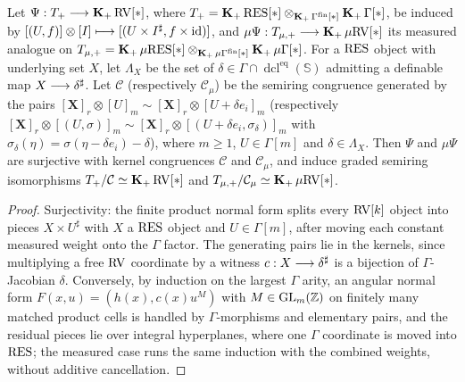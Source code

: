 \setcounter{theorem}{17}
\begin{proposition}
\label{red-D-iso}
\leanok
{}
Let $\Psi : T_+ \longrightarrow \operatorname{\mathbf{K}_+} \mathrm{RV}[*]$, where $T_+ = \operatorname{\mathbf{K}_+} \mathrm{RES}[*] \otimes_{\operatorname{\mathbf{K}_+} \Gamma^{\mathrm{fin}}[*]} \operatorname{\mathbf{K}_+} \Gamma[*]$, be induced by $[(U, f)] \otimes [I] \longmapsto [(U \times I^\sharp, f \times \operatorname{id})]$, and $\mu\Psi : T_{\mu,+} \longrightarrow \operatorname{\mathbf{K}_+} \mu\mathrm{RV}[*]$ its measured analogue on $T_{\mu,+} = \operatorname{\mathbf{K}_+} \mu\mathrm{RES}[*] \otimes_{\operatorname{\mathbf{K}_+} \mu\Gamma^{\mathrm{fin}}[*]} \operatorname{\mathbf{K}_+} \mu\Gamma[*]$. For a $\mathrm{RES}$ object with underlying set $X$, let $\Lambda_X$ be the set of $\delta \in \Gamma \cap \operatorname{dcl}^{\mathrm{eq}}(\mathbb{S})$ admitting a definable map $X \longrightarrow \delta^\sharp$. Let $\mathcal{C}$ (respectively $\mathcal{C}_\mu$) be the semiring congruence generated by the pairs $[\boldsymbol{X}]_r \otimes [U]_m \sim [\boldsymbol{X}]_r \otimes [U + \delta e_i]_m$ (respectively $[\boldsymbol{X}]_r \otimes [(U, \sigma)]_m \sim [\boldsymbol{X}]_r \otimes [(U + \delta e_i, \sigma_\delta)]_m$ with $\sigma_\delta(\eta) = \sigma(\eta - \delta e_i) - \delta$), where $m \geq 1$, $U \in \Gamma[m]$ and $\delta \in \Lambda_X$. Then $\Psi$ and $\mu\Psi$ are surjective with kernel congruences $\mathcal{C}$ and $\mathcal{C}_\mu$, and induce graded semiring isomorphisms $T_+/\mathcal{C} \simeq \operatorname{\mathbf{K}_+} \mathrm{RV}[*]$ and $T_{\mu,+}/\mathcal{C}_\mu \simeq \operatorname{\mathbf{K}_+} \mu\mathrm{RV}[*]$.
\end{proposition}

\begin{proof}
\leanok
Surjectivity: the finite product normal form splits every $\mathrm{RV}[k]$ object into pieces $X \times U^\sharp$ with $X$ a $\mathrm{RES}$ object and $U \in \Gamma[m]$, after moving each constant measured weight onto the $\Gamma$ factor. The generating pairs lie in the kernels, since multiplying a free $\mathrm{RV}$ coordinate by a witness $c : X \longrightarrow \delta^\sharp$ is a bijection of $\Gamma$-Jacobian $\delta$. Conversely, by induction on the largest $\Gamma$ arity, an angular normal form $F(x, u) = (h(x), c(x) u^M)$ with $M \in \operatorname{GL}_m(\mathbb{Z})$ on finitely many matched product cells is handled by $\Gamma$-morphisms and elementary pairs, and the residual pieces lie over integral hyperplanes, where one $\Gamma$ coordinate is moved into $\mathrm{RES}$; the measured case runs the same induction with the combined weights, without additive cancellation.
\end{proof}

